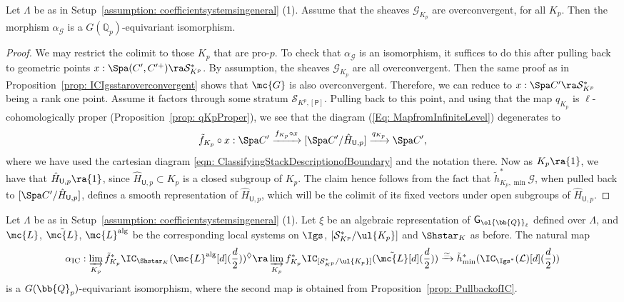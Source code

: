 \documentclass[letterpaper,11pt]{amsart}
\begin{document}
\begin{lemma}\label{lem: InfiniteLevelisColimit}
    Let $\Lambda$ be as in Setup~\ref{assumption: coefficientsystemsingeneral} (1). Assume that the sheaves $\mathcal{G}_{K_p}$ are overconvergent, for all $K_p$. Then the morphism $\alpha_{\mathcal{G}}$ is a $G(\mathbb{Q}_p)$-equivariant isomorphism. 
\end{lemma}
\begin{proof} 
We may restrict the colimit to those $K_p$ that are pro-$p$. To check that $\alpha_{\mathcal{G}}$ is an isomorphism, it suffices to do this after pulling back to geometric points $x: \Spa(C',C'^{+}) \ra \mathcal{S}^\ast_{K^p}$. By assumption, the sheaves $\mathcal{G}_{K_p}$ are all overconvergent. Then the same proof as in Proposition~\ref{prop: ICIgsstaroverconvergent} shows that $\mc{G}$ is also overconvergent. Therefore, we can reduce to $x: \Spa C' \ra \mathcal{S}^\ast_{K^p}$ being a rank one point. Assume it factors through some stratum $\mathcal{S}_{K^p,[\mathsf{P}]}$. Pulling back to this point, and using that the map $q_{K_p}$ is $\ell$-cohomologically proper (Proposition~\ref{prop: qKpProper}), we see that the diagram (\ref{Eq: MapfromInfiniteLevel}) degenerates to 
\[\tilde{f}_{K_{p}} \circ x: 
\Spa C' \xrightarrow{f_{K_{p}} \circ x} [\Spa C'/\hat{H}_{\mathsf{U},p}] \xrightarrow{q_{K_p}}\Spa C',
\]
where we have used the cartesian diagram \eqref{eqn: ClassifyingStackDescriptionofBoundary} and the notation there. Now as $K_{p} \ra \{1\}$, we have that $\hat{H}_{\mathsf{U},p} \ra \{1\}$, since $\hat{H}_{\mathsf{U},p} \subset K_{p}$ is a closed subgroup of $K_{p}$. The claim hence follows from the fact that $\tilde{h}^*_{K_p,\min}\mathcal{G}$, when pulled back to $ [\Spa C'/\hat{H}_{\mathsf{U},p}]$, defines a smooth representation of $\hat{H}_{\mathsf{U},p}$, which will be the colimit of its fixed vectors under open subgroups of $\hat{H}_{\mathsf{U},p}$. 
\end{proof}



\begin{corollary}\label{cor: InfiniteLevelisColimitIC}
Let $\Lambda$ be as in Setup~\ref{assumption: coefficientsystemsingeneral} (1). Let $\xi$ be an algebraic representation of $\mathsf{G}_{\ol{\bb{Q}}_\ell}$ defined over $\Lambda$, and $\mc{L}$, $\tilde{\mc{L}}$, $\mc{L}^\mathrm{alg}$ be the corresponding local systems on $\Igs$, $[\mathcal{S}^\ast_{K^p}/\ul{K_{p}}]$ and $\Shstar_{K}$ as before. The natural map
\[ \alpha_{\mathrm{IC}}: \varinjlim_{K_p} \tilde{f}_{K_{p}}^{*}\IC_{\Shstar_{K}}(\mc{L}^\mathrm{alg}[d](\frac{d}{2}))^{\Diamond} \ra \varinjlim_{K_p} f_{K_{p}}^{*}\IC_{[\mathcal{S}^\ast_{K^p}/\ul{K_{p}}]}(\tilde{\mc{L}}[d](\frac{d}{2})) \xrightarrow{\simeq} \tilde{h}_{\min}^\ast(\IC_{\Igs^{*}}(\mathcal{L})[d](\frac{d}{2})) \]
is a $G(\bb{Q}_{p})$-equivariant isomorphism, where the second map is obtained from Proposition~\ref{prop: PullbackofIC}.
\end{corollary}
\end{document}
